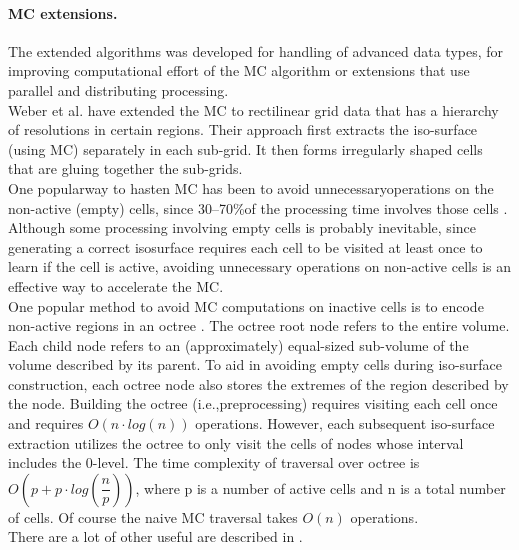 \paragraph{MC extensions.}
The extended algorithms was developed for handling of advanced data types, for improving computational effort of the MC algorithm or extensions that use parallel and distributing processing.\\
Weber et al. \cite{WeberEtAl} have extended the MC to rectilinear grid data that has a hierarchy of resolutions in certain regions. Their approach first extracts the iso-surface (using MC) separately in each sub-grid. It then forms irregularly shaped cells that are gluing together  the sub-grids.\\
One popularway  to  hasten  MC  has  been  to  avoid  unnecessaryoperations on the non-active (empty) cells, since 30–70\%of the processing time involves those cells \cite{Wilhelms1990}. Although some processing involving empty cells is probably inevitable, since generating a correct isosurface requires each cell to be visited at least once to learn if the cell is active, avoiding unnecessary operations on non-active cells is an effective way to accelerate the MC.\\
One popular method to avoid MC computations on inactive cells is to encode non-active regions in an octree \cite{WilhelmsGelder}. The octree root node refers to the entire volume. Each child node refers to an (approximately) equal-sized sub-volume of the volume described by its parent. To aid in avoiding empty cells during iso-surface construction, each octree node also stores the extremes of the region described by the node. Building the octree (i.e.,preprocessing) requires visiting each cell once and requires $O(n\cdot log(n))$ operations. However, each subsequent iso-surface extraction utilizes the octree to only visit the cells of nodes whose interval includes the 0-level. The time complexity of traversal over octree is $O\left(p + p\cdot log\left(\dfrac{n}{p}\right)\right)$, where p is a number of active cells and n is a total number of cells. Of course the naive MC traversal takes $O(n)$ operations.\\
There are a lot of other useful are described in \cite{MCSurvey}.